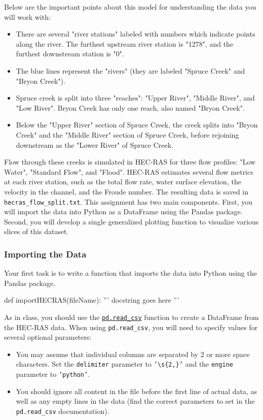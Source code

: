 \documentclass{homework}
\begin{document}
Below are the important points about this model for understanding the data you will work with:
\begin{itemize}
    \itemsep0em 
    \item There are several "river stations" labeled with numbers which indicate points along the river. The furthest upstream river station is "1278", and the furthest downstream station is "0".
    \item The blue lines represent the "rivers" (they are labeled "Spruce Creek" and "Bryon Creek").
    \item Spruce creek is split into three "reaches": "Upper River", "Middle River", and "Low River". Bryon Creek has only one reach, also named "Bryon Creek".
    \item Below the "Upper River" section of Spruce Creek, the creek splits into "Bryon Creek" and the "Middle River" section of Spruce Creek, before rejoining downstream as the "Lower River" of Spruce Creek.
\end{itemize}
Flow through these creeks is simulated in HEC-RAS for three flow profiles: "Low Water", "Standard Flow", and "Flood". HEC-RAS estimates several flow metrics at each river station, such as the total flow rate, water surface elevation, the velocity in the channel, and the Froude number. The resulting data is saved in \texttt{hecras\_flow\_split.txt}. This assignment has two main components. First, you will import the data into Python as a DataFrame using the Pandas package. Second, you will develop a single generalized plotting function to visualize various slices of this dataset.

\subsubsection*{Importing the Data}

Your first task is to write a function that imports the data into Python using the Pandas package. 

\begin{python}
def importHECRAS(fileName):
    ''' docstring goes here '''
\end{python}

As in class, you should use the \href{https://pandas.pydata.org/docs/reference/api/pandas.read_csv.html}{\texttt{pd.read\_csv}} function to create a DataFrame from the HEC-RAS data. When using \texttt{pd.read\_csv}, you will need to specify values for several optional parameters:
\begin{itemize}
    \itemsep0em 
    \item You may assume that individual columns are separated by 2 or more space characters. Set the \texttt{delimiter} parameter to \texttt{'\textbackslash s\{2,\}'} and the \texttt{engine} parameter to \texttt{'python'}.
    \item You should ignore all content in the file before the first line of actual data, as well as any empty lines in the data (find the correct parameters to set in the \texttt{pd.read\_csv} documentation).
\end{itemize}
\end{document}
